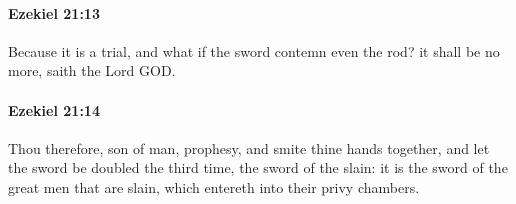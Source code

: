 		\paragraph{Ezekiel 21:13} %
			\label{EZEKIEL-21-13}

			Because it is a trial, and what if the sword contemn even the rod? it shall be no more, saith the Lord GOD.


		\paragraph{Ezekiel 21:14} %
			\label{EZEKIEL-21-14}

			Thou therefore, son of man, prophesy, and smite thine hands together, and let the sword be doubled the third time, the sword of the slain: it is the sword of the great men that are slain, which entereth into their privy chambers.


